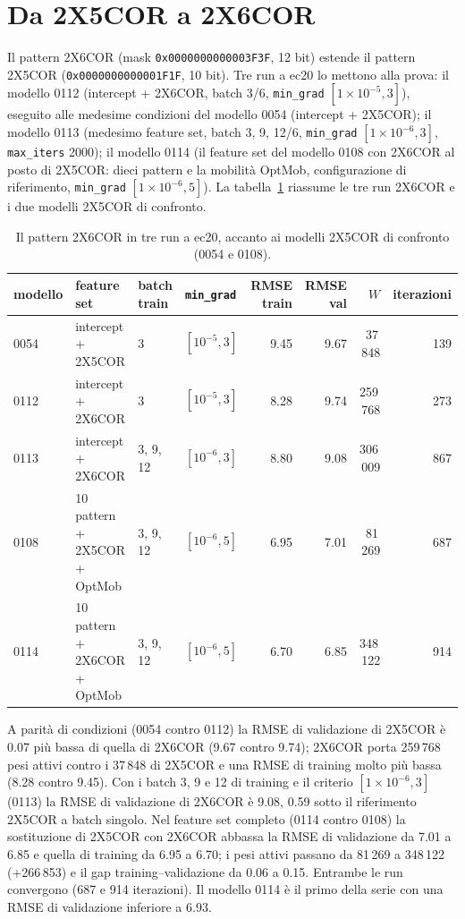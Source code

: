 \section{Da 2X5COR a 2X6COR}

Il pattern 2X6COR (mask \texttt{0x0000000000003F3F}, 12 bit)
estende il pattern 2X5COR
(\texttt{0x0000000000001F1F}, 10 bit). Tre run a ec20 lo
mettono alla prova: il modello 0112 (intercept + 2X6COR, batch
3/6, \texttt{min\_grad} $[1\times10^{-5}, 3]$), eseguito alle
medesime condizioni del modello 0054 (intercept + 2X5COR); il
modello 0113 (medesimo feature set, batch 3, 9, 12/6,
\texttt{min\_grad} $[1\times10^{-6}, 3]$, \texttt{max\_iters}
2000); il modello 0114 (il feature set del modello 0108 con
2X6COR al posto di 2X5COR: dieci pattern e la mobilità
OptMob, configurazione di riferimento, \texttt{min\_grad}
$[1\times10^{-6}, 5]$). La tabella~\ref{tab:2x6cor} riassume le
tre run 2X6COR e i due modelli 2X5COR di confronto.

\begin{table}[ht]
\centering
\small
\begin{tabular}{llllrrrr}
\toprule
modello & feature set & batch train & \texttt{min\_grad} & RMSE train & RMSE val & $W$ & iterazioni \\
\midrule
0054 & intercept + 2X5COR & 3 & $[10^{-5}, 3]$ & 9.45 & 9.67 & 37\,848 & 139 \\
0112 & intercept + 2X6COR & 3 & $[10^{-5}, 3]$ & 8.28 & 9.74 & 259\,768 & 273 \\
0113 & intercept + 2X6COR & 3, 9, 12 & $[10^{-6}, 3]$ & 8.80 & 9.08 & 306\,009 & 867 \\
0108 & 10 pattern + 2X5COR + OptMob & 3, 9, 12 & $[10^{-6}, 5]$ & 6.95 & 7.01 & 81\,269 & 687 \\
0114 & 10 pattern + 2X6COR + OptMob & 3, 9, 12 & $[10^{-6}, 5]$ & 6.70 & 6.85 & 348\,122 & 914 \\
\bottomrule
\end{tabular}
\caption{Il pattern 2X6COR in tre run a ec20, accanto ai modelli
2X5COR di confronto (0054 e 0108).}
\label{tab:2x6cor}
\end{table}

A parità di condizioni (0054 contro 0112) la RMSE di
validazione di 2X5COR è 0.07 più bassa di quella di 2X6COR
(9.67 contro 9.74); 2X6COR porta 259\,768 pesi attivi contro i
37\,848 di 2X5COR e una RMSE di training molto più bassa
(8.28 contro 9.45). Con i batch 3, 9 e 12 di training e il
criterio $[1\times10^{-6}, 3]$ (0113) la RMSE di validazione
di 2X6COR è 9.08, 0.59 sotto il riferimento 2X5COR a batch
singolo. Nel feature set completo (0114 contro 0108) la
sostituzione di 2X5COR con 2X6COR abbassa la RMSE di
validazione da 7.01 a 6.85 e quella di training da 6.95 a
6.70; i pesi attivi passano da 81\,269 a 348\,122
(+266\,853) e il gap training--validazione da 0.06 a 0.15.
Entrambe le run convergono (687 e 914 iterazioni). Il modello
0114 è il primo della serie con una RMSE di validazione
inferiore a 6.93.

